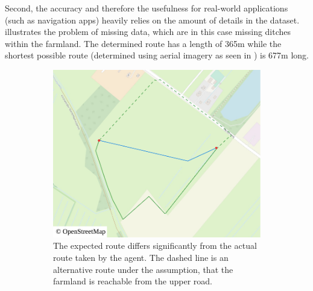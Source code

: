 			Second, the accuracy and therefore the usefulness for real-world applications (such as navigation apps) heavily relies on the amount of details in the dataset.
			 illustrates the problem of missing data, which are in this case missing ditches within the farmland.
			The determined route has a length of 365m while the shortest possible route (determined using aerial imagery as seen in ) is 677m long.
			
			\begin{figure}[h!]
				\begin{minipage}[t]{.48\textwidth}
					\begin{subfigure}[t]{\linewidth}
						\includegraphics[width=\textwidth]{images/qgis-routing-rural-routing-6-osm}
						\caption{The expected route differs significantly from the actual route taken by the agent. The dashed line is an alternative route under the assumption, that the farmland is reachable from the upper road.}
						\label{fig:eval-rural-routing-6-osm}
					\end{subfigure}
				\end{minipage}
				\hfill
				\begin{minipage}[t]{.48\textwidth}
					\begin{subfigure}[t]{\linewidth}

\end{subfigure}
\end{minipage}
\end{figure}
